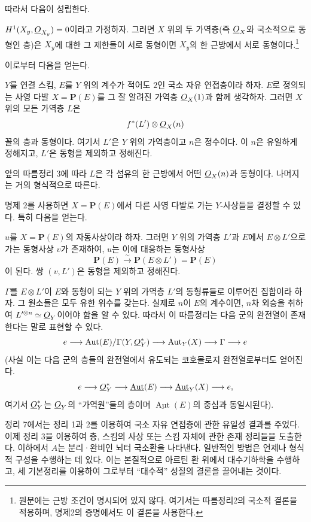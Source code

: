 따라서 다음이 성립한다.

 $H^1(X_y,\underline{O}_{X_y})=0$이라고 가정하자. 그러면
$X$ 위의 두 가역층(즉 $\underline{O}_X$와 국소적으로 동형인 층)은 $X_y$에 대한
그 제한들이 서로 동형이면 $X_y$의 한 근방에서 서로 동형이다.\footnote{원문에는 근방 조건이 명시되어 있지 않다. 여기서는 따름정리2의 국소적 결론을 적용하며, 명제2의 증명에서도 이 결론을 사용한다.}

이로부터 다음을 얻는다.

 $Y$를 연결 스킴, $E$를 $Y$ 위의 계수가 적어도 $2$인
국소 자유 연접층이라 하자. $E$로 정의되는 사영 다발
$X=\mathbf P(E)$를 그 잘 알려진 가역층 $\underline{O}_X(1)$과 함께 생각하자.
그러면 $X$ 위의 모든 가역층 $L$은
\[
  f^*(L')\otimes\underline{O}_X(n)
\]
꼴의 층과 동형이다. 여기서 $L'$은 $Y$ 위의 가역층이고 $n$은 정수이다.
이 $n$은 유일하게 정해지고, $L'$은 동형을 제외하고 정해진다.

앞의 따름정리 3에 따라 $L$은 각 섬유의 한 근방에서 어떤
$\underline{O}_X(n)$과 동형이다. 나머지는 거의 형식적으로 따른다.

명제 2를 사용하면 $X=\mathbf P(E)$에서 다른 사영 다발로 가는
$Y$-사상들을 결정할 수 있다. 특히 다음을 얻는다.

 $u$를 $X=\mathbf P(E)$의 자동사상이라 하자. 그러면
$Y$ 위의 가역층 $L'$과 $E$에서 $E\otimes L'$으로 가는 동형사상 $v$가
존재하여, $u$는 이에 대응하는 동형사상
\[
  \mathbf P(E)\xrightarrow{\sim}\mathbf P(E\otimes L')=\mathbf P(E)
\]
이 된다. 쌍 $(v,L')$은 동형을 제외하고 정해진다.

$\Gamma$를 $E\otimes L'$이 $E$와 동형이 되는 $Y$ 위의 가역층 $L'$의
동형류들로 이루어진 집합이라 하자. 그 원소들은 모두 유한 위수를 갖는다.
실제로 $n$이 $E$의 계수이면, $n$차 외승을 취하여
$L'^{\otimes n}\simeq\underline{O}_Y$이어야 함을 알 수 있다. 따라서 이
따름정리는 다음 군의 완전열이 존재한다는 말로 표현할 수 있다.
\[
  e\longrightarrow
  \operatorname{Aut}(E)/\Gamma(Y,\underline{O}_Y^*)
  \longrightarrow \operatorname{Aut}_Y(X)
  \longrightarrow \Gamma\longrightarrow e
\]
(사실 이는 다음 군의 층들의 완전열에서 유도되는 코호몰로지 완전열로부터도
얻어진다.
\[
  e\longrightarrow \underline{O}_Y^*
  \longrightarrow \underline{\operatorname{Aut}}(E)
  \longrightarrow \underline{\operatorname{Aut}}_Y(X)
  \longrightarrow e,
\]
여기서 $\underline{O}_Y^*$는 $\underline{O}_Y$의 ``가역원''들의 층이며
$\underline{\operatorname{Aut}}(E)$의 중심과 동일시된다).


정리 7에서는 정리 1과 2를 이용하여 국소 자유 연접층에 관한 유일성 결과를
주었다. 이제 정리 3을 이용하여 층, 스킴의 사상 또는 스킴 자체에 관한 존재
정리들을 도출한다. 이하에서 $A$는 분리·완비인 뇌터 국소환을 나타낸다.
일반적인 방법은 언제나 형식적 구성을 수행하는 데 있다. 이는 본질적으로
아르틴 환 위에서 대수기하학을 수행하고, 세 기본정리를 이용하여 그로부터
``대수적'' 성질의 결론을 끌어내는 것이다.

